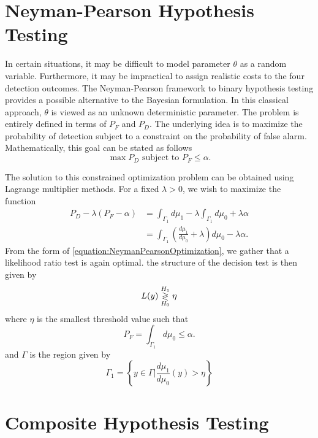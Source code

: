 \section{Neyman-Pearson Hypothesis Testing}

In certain situations, it may be difficult to model parameter $\theta$ as a random variable.
Furthermore, it may be impractical to assign realistic costs to the four detection outcomes.
The Neyman-Pearson framework to binary hypothesis testing provides a possible alternative to the Bayesian formulation.
In this classical approach, $\theta$ is viewed as an unknown deterministic parameter.
The problem is entirely defined in terms of $P_F$ and $P_D$.
The underlying idea is to maximize the probability of detection subject to a constraint on the probability of false alarm.
Mathematically, this goal can be stated as follows
\begin{equation*}
\max P_D \text{ subject to } P_F \leq \alpha .
\end{equation*}

The solution to this constrained optimization problem can be obtained using Lagrange multiplier methods.
For a fixed $\lambda > 0$, we wish to maximize the function
\begin{equation} \label{equation:NeymanPearsonOptimization}
\begin{split}
P_D - \lambda (P_F - \alpha)
&= \int_{\Gamma_1} d\mu_1 - \lambda \int_{\Gamma_1} d\mu_0 + \lambda \alpha \\
&= \int_{\Gamma_1} \left( \frac{d\mu_1}{d\mu_0}  + \lambda \right) d\mu_0
- \lambda \alpha .
\end{split}
\end{equation}
From the form of \eqref{equation:NeymanPearsonOptimization}, we gather that a likelihood ratio test is again optimal.
the structure of the decision test is then given by
\begin{equation*}
L(y) \overset{H_1}{ \underset{H_0}{\gtrless} } \eta
\end{equation*}
where $\eta$ is the smallest threshold value such that
\begin{equation*}
P_F = \int_{\Gamma_1} d\mu_0 \leq \alpha .
\end{equation*}
and $\Gamma$ is the region given by
\begin{equation*}
\Gamma_1 = \left\{ y \in \Gamma \bigg| \frac{d\mu_1}{d\mu_0}(y) > \eta \right\}
\end{equation*}

\section{Composite Hypothesis Testing}

